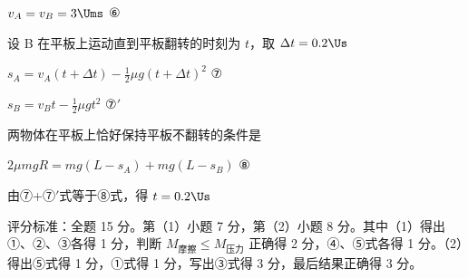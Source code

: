 \documentclass[\gkver]{gaokaozhenti}
\begin{document}
\begin{enumerate}
{$v_{A}=v_{B}=3\Ums$ ⑥

设 B 在平板上运动直到平板翻转的时刻为 $t$，取 $\Delta t=0.2\Us$

$s_{A}=v_{A}(t+\Delta t)-\frac{1}{2}\mu g(t+\Delta t)^{2}$ ⑦

$s_{B}=v_{B}t-\frac{1}{2}\mu gt^{2}$ ⑦$'$

两物体在平板上恰好保持平板不翻转的条件是

$2\mu mgR=mg(L-s_{A})+mg(L-s_{B})$ ⑧

由⑦+⑦$'$式等于⑧式，得 $t=0.2\Us$

评分标准：全题 15 分。第（1）小题 7 分，第（2）小题 8 分。其中（1）得出①、②、③各得 1 分，判断 $M_{\text{摩擦}}\le M_{\text{压力}}$ 正确得 2 分，④、⑤式各得 1 分。（2）得出⑤式得 1 分，①式得 1 分，写出③式得 3 分，最后结果正确得 3 分。
}

\end{enumerate}
\end{document}
